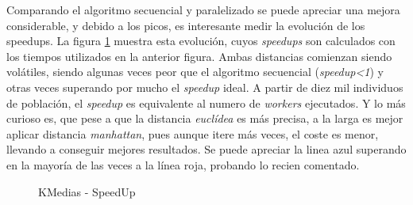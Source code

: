 			
			Comparando el algoritmo secuencial y paralelizado se puede apreciar una mejora considerable, y debido a los picos, es interesante medir la evolución de los speedups. La figura \ref{fig:Kmedias_speedup} muestra esta evolución, cuyos \textit{speedups} son calculados con los tiempos utilizados en la anterior figura. Ambas distancias comienzan siendo volátiles, siendo algunas veces peor que el algoritmo secuencial (\textit{speedup<1}) y otras veces superando por mucho el \textit{speedup} ideal. A partir de diez mil individuos de población, el \textit{speedup} es equivalente al numero de \textit{workers} ejecutados. Y lo más curioso es,  que pese a que la distancia \textit{euclídea} es más precisa, a la larga es mejor aplicar distancia \textit{manhattan}, pues aunque itere más veces, el coste es menor, llevando a conseguir mejores resultados. Se puede apreciar la linea azul superando en la mayoría de las veces a la línea roja, probando lo recien comentado.
			
			
			
			
			\begin{figure}[!h]
			\centering
			\caption{KMedias - SpeedUp}
			\label{fig:Kmedias_speedup}
			\end{figure}
			
					
					
		
